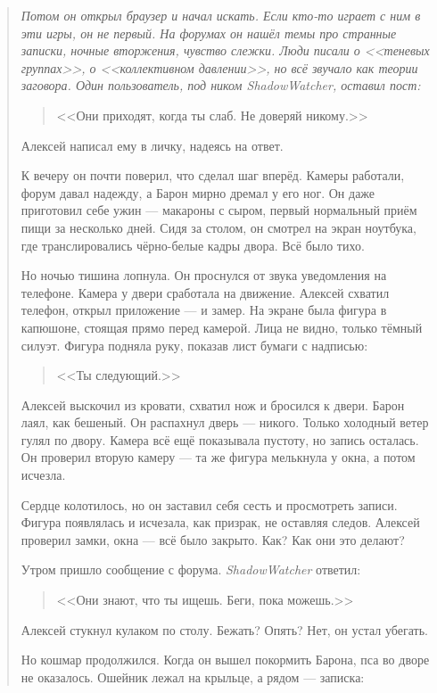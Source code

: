 \documentclass[12pt,a4paper]{book}
\newenvironment{dialogue}{\begin{quote}\itshape}{\end{quote}} %
\begin{document}
\begin{dialogue}
Потом он открыл браузер и начал искать. Если кто-то играет с ним в эти игры, он не первый. На форумах он нашёл темы про странные записки, ночные вторжения, чувство слежки. Люди писали о <<теневых группах>>, о <<коллективном давлении>>, но всё звучало как теории заговора. Один пользователь, под ником \textit{ShadowWatcher}, оставил пост:

\begin{quote}
<<Они приходят, когда ты слаб. Не доверяй никому.>>
\end{quote}

Алексей написал ему в личку, надеясь на ответ.

К вечеру он почти поверил, что сделал шаг вперёд. Камеры работали, форум давал надежду, а Барон мирно дремал у его ног. Он даже приготовил себе ужин --- макароны с сыром, первый нормальный приём пищи за несколько дней. Сидя за столом, он смотрел на экран ноутбука, где транслировались чёрно-белые кадры двора. Всё было тихо.

Но ночью тишина лопнула. Он проснулся от звука уведомления на телефоне. Камера у двери сработала на движение. Алексей схватил телефон, открыл приложение --- и замер. На экране была фигура в капюшоне, стоящая прямо перед камерой. Лица не видно, только тёмный силуэт. Фигура подняла руку, показав лист бумаги с надписью:

\begin{quote}
<<Ты следующий.>>
\end{quote}

Алексей выскочил из кровати, схватил нож и бросился к двери. Барон лаял, как бешеный. Он распахнул дверь --- никого. Только холодный ветер гулял по двору. Камера всё ещё показывала пустоту, но запись осталась. Он проверил вторую камеру --- та же фигура мелькнула у окна, а потом исчезла.

Сердце колотилось, но он заставил себя сесть и просмотреть записи. Фигура появлялась и исчезала, как призрак, не оставляя следов. Алексей проверил замки, окна --- всё было закрыто. Как? Как они это делают?

Утром пришло сообщение с форума. \textit{ShadowWatcher} ответил:

\begin{quote}
<<Они знают, что ты ищешь. Беги, пока можешь.>>
\end{quote}

Алексей стукнул кулаком по столу. Бежать? Опять? Нет, он устал убегать.

Но кошмар продолжился. Когда он вышел покормить Барона, пса во дворе не оказалось. Ошейник лежал на крыльце, а рядом --- записка:


\end{dialogue}
\end{document}
